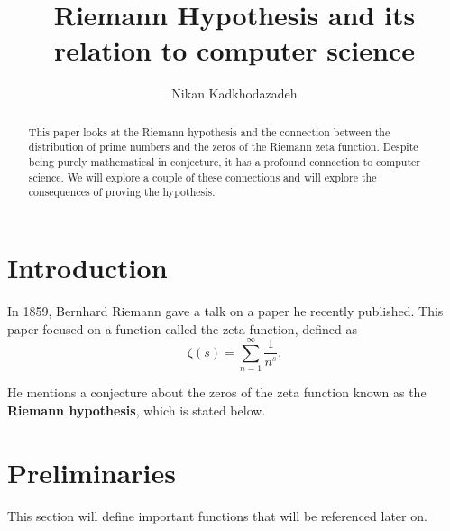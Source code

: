 \documentclass[12pt]{amsart} %
\theoremstyle{definition}
\theoremstyle{remark}
\numberwithin{equation}{section}
\begin{document}
\title{Riemann Hypothesis and its relation to computer science}

\author{Nikan Kadkhodazadeh}
\address{Department of Computer Science, University of Southern Maine, 
Portland, ME}

\begin{abstract}
This paper looks at the Riemann hypothesis and the connection between the distribution of prime numbers and the zeros of the Riemann zeta function. Despite being purely mathematical in conjecture, it has a profound connection to computer science. We will explore a couple of these connections and will explore the consequences of proving the hypothesis.
\end{abstract}

\maketitle
\tableofcontents

\section{Introduction}
In 1859, Bernhard Riemann gave a talk on a paper he recently published. This paper focused on a function called the zeta function, defined as
$$\zeta(s) = \sum_{n=1}^\infty \frac{1}{n^s}.$$

He mentions a conjecture about the zeros of the zeta function known as the \textbf{Riemann hypothesis}, which is stated below.
\\

\noindent{}

\section{Preliminaries}
This section will define important functions that will be referenced later on.
\end{document}
